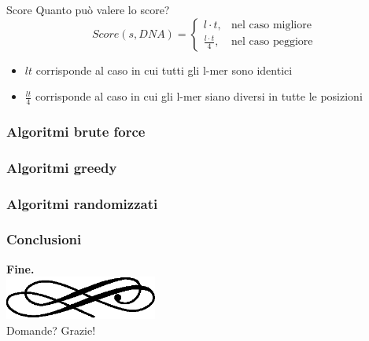 \begin{frame}{Score}
	Quanto può valere lo score?
	\begin{equation*}
		Score(s,DNA) = \begin{cases}
			l\cdot t, & \mbox{nel caso migliore}\\
			\frac{l\cdot t}{4}, & \mbox{nel caso peggiore}
		\end{cases}
	\end{equation*}
	\begin{itemize}
		\item $lt$ corrisponde al caso in cui tutti gli l-mer sono identici
		\item $\frac{lt}{4}$ corrisponde al caso in cui gli l-mer siano diversi in tutte le posizioni
	\end{itemize}
\end{frame}

\begin{frame}
  \frametitle{Algoritmi brute force}
\end{frame}

\begin{frame}
  \frametitle{Algoritmi greedy}
\end{frame}

\begin{frame}
  \frametitle{Algoritmi randomizzati}
\end{frame}

\begin{frame}
  \frametitle{Conclusioni}
\end{frame}

\begin{frame}
  \begin{center}
	\textbf{\calligra\Huge Fine.}\\
  \includegraphics[width=5cm]{img/ornament.eps}\\[1cm]
	\pause
	{\huge\calligra Domande?\pause{} Grazie!}
  \end{center}
\end{frame}
